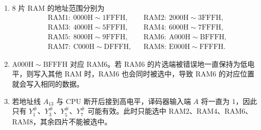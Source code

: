 \begin{problem}
\begin{solution}
\begin{enumerate}
            \item[\textbf{2)}] $8$ 片 RAM 的地址范围分别为
            $$
            \begin{aligned}
                &\text{RAM1}:\ \mathrm{0000H\sim1FFFH}, &&\text{RAM2}:\ \mathrm{2000H\sim3FFFH},\\
                &\text{RAM3}:\ \mathrm{4000H\sim5FFFH}, &&\text{RAM4}:\ \mathrm{6000H\sim7FFFH},\\
                &\text{RAM5}:\ \mathrm{8000H\sim9FFFH}, &&\text{RAM6}:\ \mathrm{A000H\sim BFFFH},\\
                &\text{RAM7}:\ \mathrm{C000H\sim DFFFH}, &&\text{RAM8}:\ \mathrm{E000H\sim FFFFH}.
            \end{aligned}
            $$

            \item[\textbf{3)}] $\mathrm{A000H}\sim\mathrm{BFFFH}$ 对应 RAM6。若 RAM6 的片选端被错误地一直保持为低电平，则写入其他 RAM 时，RAM6 也会同时被选中，导致 RAM6 的对应位置就会写入相同的数据。

            \item[\textbf{4)}] 若地址线 $A_{13}$ 与 CPU 断开后接到高电平，译码器输入端 $A$ 将一直为 $1$，因此只有 $Y_1^{\#}$、$Y_3^{\#}$、$Y_5^{\#}$、$Y_7^{\#}$ 可能有效。此时只能选中 RAM2、RAM4、RAM6、RAM8，其余四片不能被选中。
        \end{enumerate}
    \end{solution}
\end{problem}